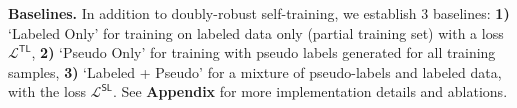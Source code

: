 \noindent \textbf{Baselines.} 
In addition to doubly-robust self-training, we establish 3 baselines: \textbf{1)} `Labeled Only' for training on labeled data only (partial training set) with a loss $\mathcal{L}^{\mathsf{TL}}$, \textbf{2)} `Pseudo Only' for training with pseudo labels generated for all training samples, \textbf{3)} `Labeled + Pseudo' for a mixture of pseudo-labels and labeled data, with the loss $\mathcal{L}^{\mathsf{SL}}$. 
See \textbf{Appendix} for more implementation details and ablations.
% 

